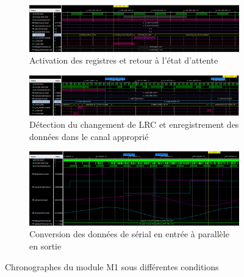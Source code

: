
\begin{figure}[H]
  \centering
  \begin{subfigure}{.496\linewidth}
    \centering
    \includegraphics[width=\textwidth]{assets/chrono-m1-param-enable-reg-activation-return-await.png}
    \caption{Activation des registres et retour à l'état d'attente}
    \label{fig:chrono-m1-param-enable-reg-activation-return-await}
  \end{subfigure}
  \begin{subfigure}{.496\linewidth}
    \centering
    \includegraphics[width=\textwidth]{assets/chrono-m1-detect-change-LRC-save-output-to-channel.png}
    \caption{Détection du changement de LRC et enregistrement des données dans le canal approprié}
    \label{fig:chrono-m1-detect-change-LRC-save-output-to-channel}
  \end{subfigure}
  \begin{subfigure}{.496\linewidth}
    \centering
    \includegraphics[width=\textwidth]{assets/chrono-m1-input-becomes-output.png}
    \caption{Conversion des données de sérial en entrée à parallèle en sortie}
    \label{fig:chrono-m1-input-becomes-output}
  \end{subfigure}
  \caption{Chronographes du module M1 sous différentes conditions}
\end{figure}






